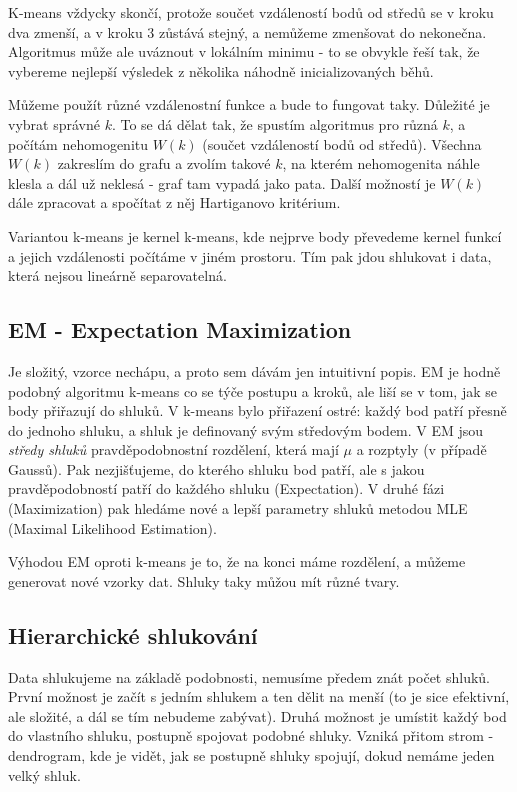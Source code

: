 K-means vždycky skončí, protože součet vzdáleností bodů od středů se v kroku dva zmenší, a v kroku 3 zůstává stejný, a nemůžeme zmenšovat do nekonečna. Algoritmus může ale uváznout v lokálním minimu - to se obvykle řeší tak, že vybereme nejlepší výsledek z několika náhodně inicializovaných běhů.

Můžeme použít různé vzdálenostní funkce a bude to fungovat taky. Důležité je vybrat správné $k$. To se dá dělat tak, že spustím algoritmus pro různá $k$, a počítám nehomogenitu $W(k)$ (součet vzdáleností bodů od středů). Všechna $W(k)$ zakreslím do grafu a zvolím takové $k$, na kterém nehomogenita náhle klesla a dál už neklesá - graf tam vypadá jako pata. Další možností je $W(k)$ dále zpracovat a spočítat z něj Hartiganovo kritérium.

Variantou k-means je kernel k-means, kde nejprve body převedeme kernel funkcí a jejich vzdálenosti počítáme v jiném prostoru. Tím pak jdou shlukovat i data, která nejsou lineárně separovatelná.

\subsection{EM - Expectation Maximization}

Je složitý, vzorce nechápu, a proto sem dávám jen intuitivní popis. EM je hodně podobný algoritmu k-means co se týče postupu a kroků, ale liší se v tom, jak se body přiřazují do shluků. V k-means bylo přiřazení ostré: každý bod patří přesně do jednoho shluku, a shluk je definovaný svým středovým bodem. V EM jsou \textit{středy shluků} pravděpodobnostní rozdělení, která mají $\mu$ a rozptyly (v případě Gaussů). Pak nezjišťujeme, do kterého shluku bod patří, ale s jakou pravděpodobností patří do každého shluku (Expectation). V druhé fázi (Maximization) pak hledáme nové a lepší parametry shluků metodou MLE (Maximal Likelihood Estimation).

Výhodou EM oproti k-means je to, že na konci máme rozdělení, a můžeme generovat nové vzorky dat. Shluky taky můžou mít různé tvary.


\subsection{Hierarchické shlukování}

Data shlukujeme na základě podobnosti, nemusíme předem znát počet shluků. První možnost je začít s jedním shlukem a ten dělit na menší (to je sice efektivní, ale složité, a dál se tím nebudeme zabývat). Druhá možnost je umístit každý bod do vlastního shluku, postupně spojovat podobné shluky. Vzniká přitom strom - dendrogram, kde je vidět, jak se postupně shluky spojují, dokud nemáme jeden velký shluk.

